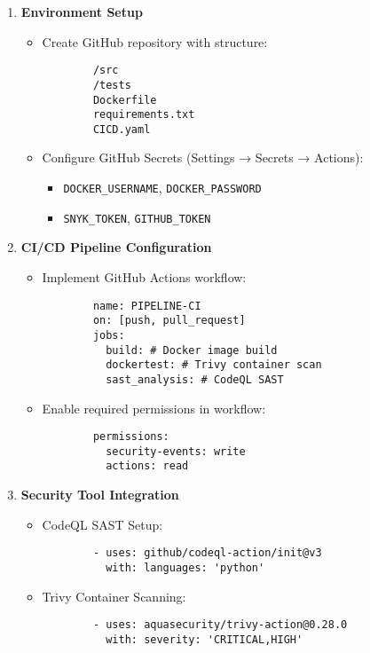 \documentclass[conference]{IEEEtran}
\begin{document}
\begin{enumerate}
    \item \textbf{Environment Setup}
    \begin{itemize}
        \item Create GitHub repository with structure:
        \begin{verbatim}
        /src
        /tests
        Dockerfile
        requirements.txt
        CICD.yaml 
        \end{verbatim}
        \item Configure GitHub Secrets (Settings → Secrets → Actions):
        \begin{itemize}
            \item \texttt{DOCKER\_USERNAME}, \texttt{DOCKER\_PASSWORD}
            \item \texttt{SNYK\_TOKEN}, \texttt{GITHUB\_TOKEN}
        \end{itemize}
    \end{itemize}

    \item \textbf{CI/CD Pipeline Configuration}
    \begin{itemize}
        \item Implement GitHub Actions workflow:
        \begin{verbatim}
        name: PIPELINE-CI
        on: [push, pull_request]
        jobs:
          build: # Docker image build
          dockertest: # Trivy container scan
          sast_analysis: # CodeQL SAST
        \end{verbatim}
        \item Enable required permissions in workflow:
        \begin{verbatim}
        permissions:
          security-events: write
          actions: read
        \end{verbatim}
    \end{itemize}

    \item \textbf{Security Tool Integration}
    \begin{itemize}
        \item CodeQL SAST Setup:
        \begin{verbatim}
        - uses: github/codeql-action/init@v3
          with: languages: 'python'
        \end{verbatim}
        
        \item Trivy Container Scanning:
        \begin{verbatim}
        - uses: aquasecurity/trivy-action@0.28.0
          with: severity: 'CRITICAL,HIGH'
        \end{verbatim}
        

\end{itemize}
\end{enumerate}
\end{document}
